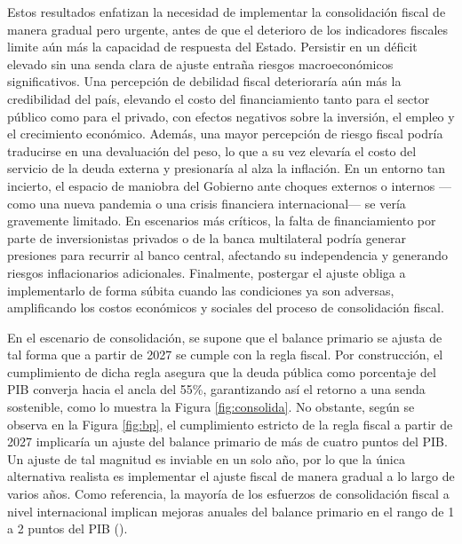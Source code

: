 Estos resultados enfatizan la necesidad de implementar la consolidación fiscal de manera gradual pero urgente, antes de que el deterioro de los indicadores fiscales limite aún más la capacidad de respuesta del Estado. Persistir en un déficit elevado sin una senda clara de ajuste entraña riesgos macroeconómicos significativos. Una percepción de debilidad fiscal deterioraría aún más la credibilidad del país, elevando el costo del financiamiento tanto para el sector público como para el privado, con efectos negativos sobre la inversión, el empleo y el crecimiento económico. Además, una mayor percepción de riesgo fiscal podría traducirse en una devaluación del peso, lo que a su vez elevaría el costo del servicio de la deuda externa y presionaría al alza la inflación. En un entorno tan incierto, el espacio de maniobra del Gobierno ante choques externos o internos —como una nueva pandemia o una crisis financiera internacional— se vería gravemente limitado. En escenarios más críticos, la falta de financiamiento por parte de inversionistas privados o de la banca multilateral podría generar presiones para recurrir al banco central, afectando su independencia y generando riesgos inflacionarios adicionales. Finalmente, postergar el ajuste obliga a implementarlo de forma súbita cuando las condiciones ya son adversas, amplificando los costos económicos y sociales del proceso de consolidación fiscal.

 
En el escenario de consolidación, se supone que el balance primario se ajusta de tal forma que a partir de 2027 se cumple con la regla fiscal. Por construcción, el cumplimiento de dicha regla asegura que la deuda pública como porcentaje del PIB converja hacia el ancla del 55\%, garantizando así el retorno a una senda sostenible, como lo muestra la Figura \ref{fig:consolida}. No obstante, según se observa en la Figura \ref{fig:bp}, el cumplimiento estricto de la regla fiscal a partir de 2027 implicaría un ajuste del balance primario de más de cuatro puntos del PIB. Un ajuste de tal magnitud es inviable en un solo año, por lo que la única alternativa realista es implementar el ajuste fiscal de manera gradual a lo largo de varios años. Como referencia, la mayoría de los esfuerzos de consolidación fiscal a nivel internacional implican mejoras anuales del balance primario en el rango de 1 a 2 puntos del PIB (\cite{imfconsolidation2023}).

